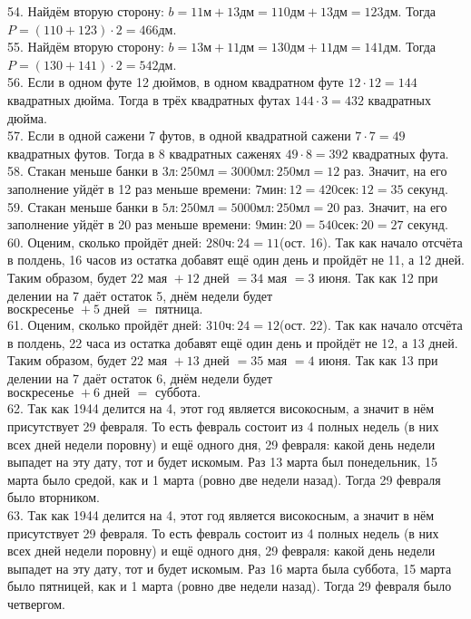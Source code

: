 54. Найдём вторую сторону: $b=11\text{м}+13\text{дм}=110\text{дм}+13\text{дм}=123$дм. Тогда $P=(110+123)\cdot2=466$дм.\\
55. Найдём вторую сторону: $b=13\text{м}+11\text{дм}=130\text{дм}+11\text{дм}=141$дм. Тогда $P=(130+141)\cdot2=542$дм.\\
56. Если в одном футе 12 дюймов, в одном квадратном футе $12\cdot12=144$ квадратных дюйма. Тогда в трёх квадратных футах $144\cdot3=432$ квадратных дюйма.\\
57. Если в одной сажени 7 футов, в одной квадратной сажени $7\cdot7=49$ квадратных футов. Тогда в 8 квадратных саженях $49\cdot8=392$ квадратных фута.\\
58. Стакан меньше банки в $3\text{л}:250\text{мл}=3000\text{мл}:250\text{мл}=12$ раз. Значит, на его заполнение уйдёт в 12 раз меньше времени: $7\text{мин}:12=420\text{сек}:12=35$ секунд.\\
59. Стакан меньше банки в $5\text{л}:250\text{мл}=5000\text{мл}:250\text{мл}=20$ раз. Значит, на его заполнение уйдёт в 20 раз меньше времени: $9\text{мин}:20=540\text{сек}:20=27$ секунд.\\
60. Оценим, сколько пройдёт дней: $280\text{ч}:24=11$(ост. 16). Так как начало отсчёта в полдень, 16 часов из остатка добавят ещё один день и пройдёт не 11, а 12 дней. Таким образом, будет $22\text{ мая }+12\text{ дней }=34\text{ мая }=3\text{ июня}.$ Так как 12 при делении на 7 даёт остаток 5, днём недели будет $\text{воскресенье }+5\text{ дней }=\text{ пятница.}$\\
61. Оценим, сколько пройдёт дней: $310\text{ч}:24=12$(ост. 22). Так как начало отсчёта в полдень, 22 часа из остатка добавят ещё один день и пройдёт не 12, а 13 дней. Таким образом, будет $22\text{ мая }+13\text{ дней }=35\text{ мая }=4\text{ июня}.$ Так как 13 при делении на 7 даёт остаток 6, днём недели будет $\text{воскресенье }+6\text{ дней }=\text{ суббота.}$\\
62. Так как 1944 делится на 4, этот год является високосным, а значит в нём присутствует 29 февраля. То есть февраль состоит из 4 полных недель (в них всех дней недели поровну) и ещё одного дня, 29 февраля: какой день недели выпадет на эту дату, тот и будет искомым. Раз 13 марта был понедельник, 15 марта было средой, как и 1 марта (ровно две недели назад). Тогда 29 февраля было вторником.\\
63. Так как 1944 делится на 4, этот год является високосным, а значит в нём присутствует 29 февраля. То есть февраль состоит из 4 полных недель (в них всех дней недели поровну) и ещё одного дня, 29 февраля: какой день недели выпадет на эту дату, тот и будет искомым. Раз 16 марта была суббота, 15 марта было пятницей, как и 1 марта (ровно две недели назад). Тогда 29 февраля было четвергом.\\

